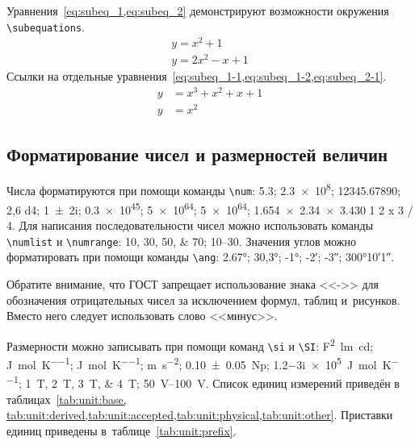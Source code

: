 Уравнения~\cref{eq:subeq_1,eq:subeq_2} демонстрируют возможности
окружения \verb|\subequations|.
\begin{subequations}
    \label{eq:subeq_1}
    \begin{gather}
        y = x^2 + 1 \label{eq:subeq_1-1} \\
        y = 2 x^2 - x + 1 \label{eq:subeq_1-2}
    \end{gather}
\end{subequations}
Ссылки на отдельные уравнения~\cref{eq:subeq_1-1,eq:subeq_1-2,eq:subeq_2-1}.
\begin{subequations}
    \label{eq:subeq_2}
    \begin{align}
        y & = x^3 + x^2 + x + 1 \label{eq:subeq_2-1} \\
        y & = x^2
    \end{align}
\end{subequations}

\subsection{Форматирование чисел и размерностей величин}\label{sec:units}

Числа форматируются при помощи команды \verb|\num|:
\num{5,3};
\num{2,3e8};
\num{12345,67890};
\num{2,6 d4};
\num{1+-2i};
\num{.3e45};
\num[exponent-base=2]{5 e64};
\num[exponent-base=2,exponent-to-prefix]{5 e64};
\num{1.654 x 2.34 x 3.430}
\num{1 2 x 3 / 4}.
Для написания последовательности чисел можно использовать команды \verb|\numlist| и \verb|\numrange|:
\numlist{10;30;50;70}; \numrange{10}{30}.
Значения углов можно форматировать при помощи команды \verb|\ang|:
\ang{2.67};
\ang{30,3};
\ang{-1;;};
\ang{;-2;};
\ang{;;-3};
\ang{300;10;1}.

Обратите внимание, что ГОСТ запрещает использование знака <<->> для обозначения отрицательных чисел
за исключением формул, таблиц и~рисунков.
Вместо него следует использовать слово <<минус>>.

Размерности можно записывать при помощи команд \verb|\si| и \verb|\SI|:
\si{\farad\squared\lumen\candela};
\si{\joule\per\mole\per\kelvin};
\si[per-mode = symbol-or-fraction]{\joule\per\mole\per\kelvin};
\si{\metre\per\second\squared};
\SI{0.10(5)}{\neper};
\SI{1.2-3i e5}{\joule\per\mole\per\kelvin};
\SIlist{1;2;3;4}{\tesla};
\SIrange{50}{100}{\volt}.
Список единиц измерений приведён в таблицах~\cref{tab:unit:base,
    tab:unit:derived,tab:unit:accepted,tab:unit:physical,tab:unit:other}.
Приставки единиц приведены в~таблице~\cref{tab:unit:prefix}.

